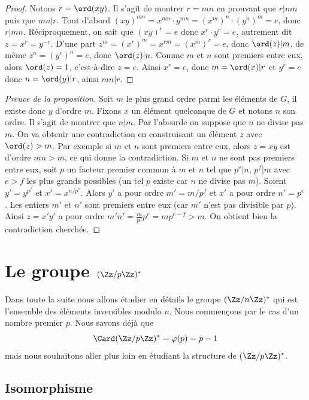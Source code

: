 \documentclass[11pt,class=report,crop=false]{standalone}
\begin{document}
\begin{proof}
Notons $r=\ord(xy)$. Il s'agit de montrer $r=mn$ en prouvant que $r | mn$ puis que $mn | r$.
Tout d'abord $(xy)^{mn} = x^{mn}\cdot y^{mn} = (x^m)^n \cdot (y^n)^m = e$, donc $r | mn$.
Réciproquement, on sait que $(xy)^r=e$ donc $x^r \cdot y^r=e$, autrement dit
$z=x^r = y^{-r}$. D'une part $z^m = (x^r)^m = x^{rm} = (x^m)^r = e$, donc $\ord(z) | m$,
de même $z^n = (y^r)^n = e$, donc $\ord(z) | n$. Comme $m$ et $n$ sont premiers entre eux, alors $\ord(z)=1$, c'est-à-dire $z = e$. Ainsi $x^r=e$, donc $m=\ord(x)|r$ et
$y^r=e$ donc $n=\ord(y) | r$, ainsi $mn|r$.
\end{proof}

\begin{proof}[Preuve de la proposition]
Soit $m$ le plus grand ordre parmi les éléments de $G$,
il existe donc $y$ d'ordre $m$. 
Fixons $x$ un élément quelconque de $G$ et notons $n$ son ordre. 
Il s'agit de montrer que $n|m$.
Par l'absurde on suppose que $n$ ne divise pas $m$. 
On va obtenir une contradiction en construisant un élément $z$ avec $\ord(z)>m$.
Par exemple si $m$ et $n$ sont premiers entre eux, alors $z=xy$ est d'ordre $mn>m$, ce qui donne la contradiction.
Si $m$ et $n$ ne sont pas premiers entre eux, soit $p$ un facteur premier commun à $m$ et $n$ tel que $p^e | n$, $p^f | m$ avec $e>f$ les plus grands possibles (un tel $p$ existe car $n$ ne divise pas $m$). 
Soient $y' = y^{p^f}$ et $x' = x^{n/p^e}$. Alors  $y'$ a pour ordre $m'=m/p^f$ et $x'$ a pour ordre $n'=p^e$. Les entiers $m'$ et $n'$ sont premiers entre eux (car $m'$ n'est pas divisible par $p$). Ainsi $z=x'y'$ a pour ordre $m'n' = \frac{m}{p^f} p^e = m p^{e-f} > m$. On obtient bien la contradiction cherchée.
\end{proof}


\section{Le groupe $(\Zz/p\Zz)^*$}

Dans toute la suite nous allons étudier en détails le groupe $(\Zz/n\Zz)^*$ qui est l'ensemble des éléments inversibles modulo $n$. 
Nous commençons par le cas d'un nombre premier $p$.
Nous savons déjà que 
$$\Card (\Zz/p\Zz)^* = \varphi(p) = p-1$$ mais nous souhaitons aller plus loin en étudiant la structure de $(\Zz/p\Zz)^*$.

\subsection{Isomorphisme}
\end{document}
